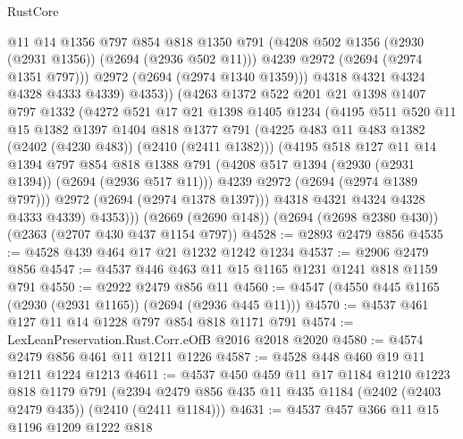 \begin{lexlean}{RustCore}
\begin{coremodule}
                  @11
                  @14
                  @1356
                  @797
                  @854
                  @818
                  @1350
                  @791
                  (@4208 @502 @1356 (@2930 (@2931 @1356)) (@2694 (@2936 @502 @11)))
                  @4239
                  @2972
                  (@2694 (@2974 @1351 @797)))
                @2972
                (@2694 (@2974 @1340 @1359)))
              @4318
              @4321
              @4324
              @4328
              @4333
              @4339)
            @4353))
        (@4263
          @1372
          @522
          @201
          @21
          @1398
          @1407
          @797
          @1332
          (@4272
            @521
            @17
            @21
            @1398
            @1405
            @1234
            (@4195
              @511
              @520
              @11
              @15
              @1382
              @1397
              @1404
              @818
              @1377
              @791
              (@4225 @483 @11 @483 @1382 (@2402 (@4230 @483)) (@2410 (@2411 @1382)))
              (@4195
                @518
                @127
                @11
                @14
                @1394
                @797
                @854
                @818
                @1388
                @791
                (@4208 @517 @1394 (@2930 (@2931 @1394)) (@2694 (@2936 @517 @11)))
                @4239
                @2972
                (@2694 (@2974 @1389 @797)))
              @2972
              (@2694 (@2974 @1378 @1397)))
            @4318
            @4321
            @4324
            @4328
            @4333
            @4339)
          @4353)))
    (@2669 (@2690 @148))
    (@2694 (@2698 @2380 @430))
    (@2363 (@2707 @430 @437 @1154 @797))
@4528 := @2893 @2479 @856
@4535 := @4528 @439 @464 @17 @21 @1232 @1242 @1234
@4537 := @2906 @2479 @856
@4547 := @4537 @446 @463 @11 @15 @1165 @1231 @1241 @818 @1159 @791
@4550 := @2922 @2479 @856 @11
@4560 := @4547 (@4550 @445 @1165 (@2930 (@2931 @1165)) (@2694 (@2936 @445 @11)))
@4570 := @4537 @461 @127 @11 @14 @1228 @797 @854 @818 @1171 @791
@4574 := LexLeanPreservation.Rust.Corr.eOfB @2016 @2018 @2020
@4580 := @4574 @2479 @856 @461 @11 @1211 @1226
@4587 := @4528 @448 @460 @19 @11 @1211 @1224 @1213
@4611 := @4537
    @450
    @459
    @11
    @17
    @1184
    @1210
    @1223
    @818
    @1179
    @791
    (@2394 @2479 @856 @435 @11 @435 @1184 (@2402 (@2403 @2479 @435)) (@2410 (@2411 @1184)))
@4631 := @4537
    @457
    @366
    @11
    @15
    @1196
    @1209
    @1222
    @818

\end{coremodule}
\end{lexlean}
